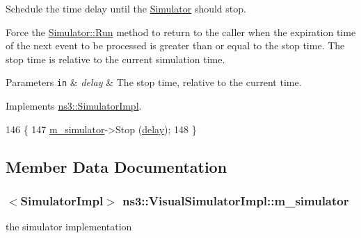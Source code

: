 Schedule the time delay until the \hyperlink{classns3_1_1Simulator}{Simulator} should stop.

Force the \hyperlink{classns3_1_1Simulator_a84be982e6d03b62c3dc3303c75a9b909}{Simulator\+::\+Run} method to return to the caller when the expiration time of the next event to be processed is greater than or equal to the stop time. The stop time is relative to the current simulation time. 
\begin{DoxyParams}[1]{Parameters}
\mbox{\tt in}  & {\em delay} & The stop time, relative to the current time. \\
\hline
\end{DoxyParams}


Implements \hyperlink{classns3_1_1SimulatorImpl_a8cd4ff5659b9f06af3da2897a1fea142}{ns3\+::\+Simulator\+Impl}.


\begin{DoxyCode}
146 \{
147   \hyperlink{classns3_1_1VisualSimulatorImpl_a7b9ed59ce7157aa47497a586be580a24}{m\_simulator}->Stop (\hyperlink{lte_2model_2fading-traces_2fading__trace__generator_8m_a7964e6aa8f61a9d28973c8267a606ad8}{delay});
148 \}
\end{DoxyCode}


\subsection{Member Data Documentation}
\subsubsection[{\texorpdfstring{m\+\_\+simulator}{m_simulator}}]{$<${\bf Simulator\+Impl}$>$ ns3\+::\+Visual\+Simulator\+Impl\+::m\+\_\+simulator\hspace{0.3cm}{\ttfamily [private]}}\hypertarget{classns3_1_1VisualSimulatorImpl_a7b9ed59ce7157aa47497a586be580a24}{}\label{classns3_1_1VisualSimulatorImpl_a7b9ed59ce7157aa47497a586be580a24}


the simulator implementation 

